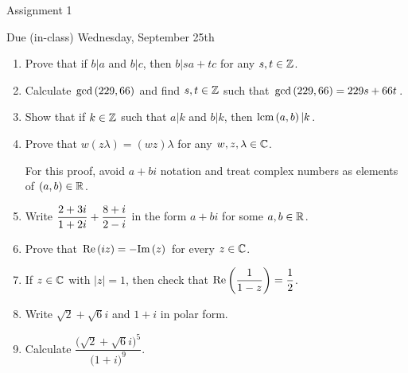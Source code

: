 \documentclass[11pt,fleqn,dvipsnames,usenames]{article}
\renewcommand{\headrulewidth}{1pt}
\begin{document}
\fancyhead[L]{\course}
\fancyhead[R]{\term}
\renewcommand{\headrulewidth}{0.4pt}

\begin{center}
{\huge Assignment 1}
\vsp

{\large Due (in-class) Wednesday, September 25th}
\end{center}

\begin{enumerate}
\item Prove that if $b|a$ and $b|c$, then $b|sa+tc$ for any $s,t\in\mathbb{Z}$.
\item Calculate $\text{gcd}\left(229,66\right)$ and find $s,t\in\mathbb{Z}$ such that $\text{gcd}\left(229,66\right) = 229s + 66t$.
\item Show that if $k\in\mathbb{Z}$ such that $a|k$ and $b|k$, then $\text{lcm}\left(a, b\right)|k$.
\item Prove that $w(z\lambda) = (wz)\lambda$ for any $w,z,\lambda\in\mathbb{C}$.

\note For this proof, avoid $a+bi$ notation and treat complex numbers as elements of $(a,b)\in\mathbb{R}$.

\item Write $\displaystyle{\frac{2 + 3i}{1 + 2i} + \frac{8+i}{2-i}}$ in the form $a+bi$ for some $a,b\in\mathbb{R}$.
\item Prove that $\text{Re}\left(iz\right) = -\text{Im}\left(z\right)$ for every $z\in\mathbb{C}$.
\item If $z\in\mathbb{C}$ with $|z| = 1$, then check that $\text{Re}\left(\dfrac{1}{1-z}\right) = \dfrac{1}{2}$.
\item Write $\sqrt{2} + \sqrt{6}i$ and $1+i$ in polar form.
\item Calculate $\dfrac{\big(\sqrt{2} + \sqrt{6}i\big)^5}{\big(1+i\big)^9}$.
\end{enumerate}
\vsp
\end{document}
